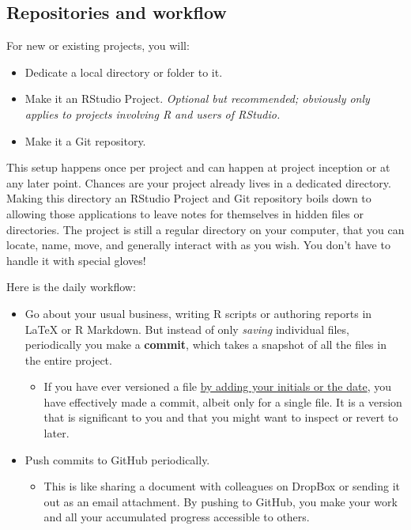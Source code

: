 \documentclass[12pt]{article}
\providecommand{\tightlist}{%
  \setlength{\itemsep}{0pt}\setlength{\parskip}{0pt}}
\begin{document}
\subsection{Repositories and workflow}\label{repositories-and-workflow}

For new or existing projects, you will:

\begin{itemize}
\tightlist
\item
  Dedicate a local directory or folder to it.
\item
  Make it an RStudio Project. \emph{Optional but recommended; obviously
  only applies to projects involving R and users of RStudio.}
\item
  Make it a Git repository.
\end{itemize}

This setup happens once per project and can happen at project inception
or at any later point. Chances are your project already lives in a
dedicated directory. Making this directory an RStudio Project and Git
repository boils down to allowing those applications to leave notes for
themselves in hidden files or directories. The project is still a
regular directory on your computer, that you can locate, name, move, and
generally interact with as you wish. You don't have to handle it with
special gloves!

Here is the daily workflow:

\begin{itemize}
\tightlist
\item
  Go about your usual business, writing R scripts or authoring reports
  in LaTeX or R Markdown. But instead of only \emph{saving} individual
  files, periodically you make a \textbf{commit}, which takes a snapshot
  of all the files in the entire project.

  \begin{itemize}
  \tightlist
  \item
    If you have ever versioned a file
    \href{http://www.phdcomics.com/comics/archive.php?comicid=1531}{by
    adding your initials or the date}, you have effectively made a
    commit, albeit only for a single file. It is a version that is
    significant to you and that you might want to inspect or revert to
    later.
  \end{itemize}
\item
  Push commits to GitHub periodically.

  \begin{itemize}
  \tightlist
  \item
    This is like sharing a document with colleagues on DropBox or
    sending it out as an email attachment. By pushing to GitHub, you
    make your work and all your accumulated progress accessible to
    others.
  \end{itemize}
\end{itemize}
\end{document}
